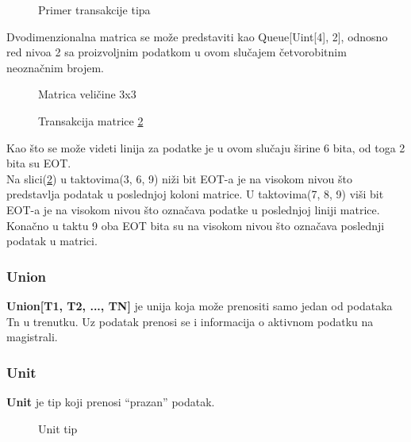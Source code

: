 \begin{figure}[H]
  \centering{
    \resizebox{0.6\textwidth}{!}{%
      
    }}
  \caption{Primer transakcije tipa}
  \label{queue_img1}
\end{figure}

Dvodimenzionalna matrica se može predstaviti kao Queue[Uint[4], 2],
odnosno red nivoa 2 sa proizvoljnim podatkom u ovom slučajem četvorobitnim
neoznačnim brojem.

\begin{figure}[H]
  \centering{
    \resizebox{0.25\textwidth}{!}{%
      
    }}
\caption{Matrica veličine 3x3}
\label{queue_matrix1}
\end{figure}

\begin{figure}[H]
\centering{
  \resizebox{.9\textwidth}{!}{%
    
  }}
\caption{Transakcija matrice \ref{queue_matrix1}}
\label{queue_matrix2}
\end{figure}

Kao što se može videti linija za podatke je u ovom slučaju širine 6 bita, od
toga 2 bita su EOT. \\
Na slici(\ref{queue_matrix1}) u taktovima(3, 6, 9) niži bit EOT-a je na visokom nivou
što predstavlja podatak u poslednjoj koloni matrice.
U taktovima(7, 8, 9) viši bit EOT-a je na visokom nivou što označava podatke u poslednjoj
liniji matrice.
Konačno u taktu 9 oba EOT bita su na visokom nivou što označava poslednji podatak u matrici.

\subsubsection{Union} \label{union_sec}
\textbf{Union[T1, T2, ..., TN]} je unija koja može prenositi samo jedan od
  podataka Tn u trenutku.
  Uz podatak prenosi se i informacija o aktivnom podatku na magistrali.

\subsubsection{Unit} \label{unit_sec}
\textbf{Unit} je tip koji prenosi ``prazan'' podatak.

\begin{figure}[H]
\centering{
  \resizebox{.35\textwidth}{!}{%
    
  }}
\caption{Unit tip}
\label{unit_img1}
\end{figure}

